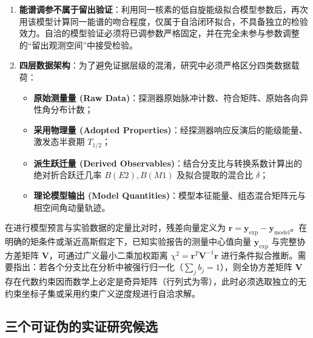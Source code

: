 \begin{enumerate}
\begin{itemize}
\item \textbf{拟合参数协方差 (Fitting Covariance)}：能谱重叠峰非线性拟合中峰位、半高宽与峰面积之间的协方差；
\item \textbf{留出检验协方差 (Holdout Covariance)}：在多维参数空间中，若检验集与训练集共享中间标定参数，将削弱留出检验的条件独立性；
\item \textbf{同采集协方差 (Co-acquisition Covariance)}：同一次核反应中由于相同复合核布居历史、复杂的侧馈送（side-feeding）时间延迟及同一母态寿命所引起的物理量统计关联。需要说明，这些协方差机制在实际数据中相互交织，共享物理因素并不必然导致所有参数间的相关系数都呈现强正相关。
\end{itemize}
\item \textbf{能谱调参不属于留出验证}：利用同一核素的低自旋能级拟合模型参数后，再次用该模型计算同一能谱的吻合程度，仅属于自洽闭环拟合，不具备独立的检验效力。自洽的模型验证必须将已调参数严格固定，并在完全未参与参数调整的“留出观测空间”中接受检验。
\item \textbf{四层数据架构}：为了避免证据层级的混淆，研究中必须严格区分四类数据载荷：
\begin{itemize}
\item \textbf{原始测量量 (Raw Data)}：探测器原始脉冲计数、符合矩阵、原始各向异性角分布计数；
\item \textbf{采用物理量 (Adopted Properties)}：经探测器响应反演后的能级能量、激发态半衰期 $T_{1/2}$；
\item \textbf{派生跃迁量 (Derived Observables)}：结合分支比与转换系数计算出的绝对折合跃迁几率 $B(E2), B(M1)$ 及拟合提取的混合比 $\delta$；
\item \textbf{理论模型输出 (Model Quantities)}：模型本征能量、组态混合矩阵元与相空间角动量轨迹。
\end{itemize}
\end{enumerate}

在进行模型预言与实验数据的定量比对时，残差向量定义为 $\mathbf{r} = \mathbf{y}_{\mathrm{exp}} - \mathbf{y}_{\mathrm{model}}$。在明确的矩条件或渐近高斯假定下，已知实验报告的测量中心值向量 $\mathbf{y}_{\mathrm{exp}}$ 与完整协方差矩阵 $\mathbf{V}$，可通过广义最小二乘加权距离 $\chi^2 = \mathbf{r}^T \mathbf{V}^{-1} \mathbf{r}$ 进行条件拟合推断。需要指出：若各个分支比在分析中被强行归一化（$\sum_j b_j = 1$），则全协方差矩阵 $\mathbf{V}$ 存在代数约束因而数学上必定是奇异矩阵（行列式为零），此时必须选取独立的无约束坐标子集或采用约束广义逆度规进行自洽求解。

\subsection{三个可证伪的实证研究候选}\label{sec:3-8-4}

